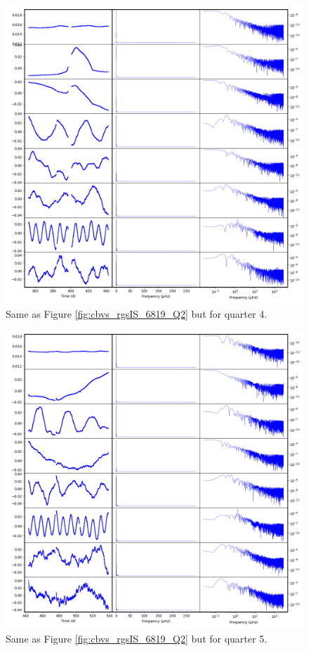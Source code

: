 \begin{figure}
    \centering
    \includegraphics[width=\linewidth]{Chapter_Appended/AppB/cbv_6819_rgs_q04.png}
    \caption{Same as Figure \ref{fig:cbvs_rgsIS_6819_Q2} but for quarter 4.}
    \label{fig:cbvs_rgsIS_6819_Q04}
\end{figure}


\begin{figure}
    \centering
    \includegraphics[width=\linewidth]{Chapter_Appended/AppB/cbv_6819_rgs_q05.png}
    \caption{Same as Figure \ref{fig:cbvs_rgsIS_6819_Q2} but for quarter 5.}
    \label{fig:cbvs_rgsIS_6819_Q05}
\end{figure}


